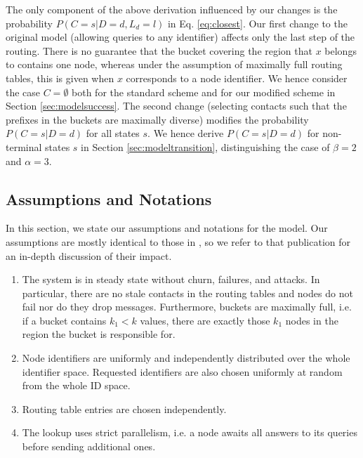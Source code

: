 \documentclass[10pt, conference, compsocconf, letterpaper]{IEEEtran}
\newcommand{\found}{\emptyset}
\begin{document}
The only component of the above derivation influenced by our changes is the probability $P(C = s | D = d,L_d=l)$ in Eq. \ref{eq:closest}. Our first change to the original model \cite{roos13comprehending} (allowing queries to any identifier) affects only the last step of the routing. There is no guarantee that the bucket covering the region that $x$ belongs to contains one node, whereas under the assumption of maximally full routing tables, this is given when $x$ corresponds to a node identifier. We hence consider the case $C=\found$ both for the standard scheme and for our modified scheme in Section \ref{sec:modelsuccess}.
The second change (selecting contacts such that the prefixes in the buckets are maximally diverse) modifies the probability $P(C = s | D = d)$ for all states $s$. We hence derive $P(C = s | D = d)$ for non-terminal states $s$ in Section \ref{sec:modeltransition}, distinguishing the case of $\beta=2$ and $\alpha=3$.

\subsection{Assumptions and Notations}
In this section, we state our assumptions and notations for the model. Our assumptions are mostly identical to those in \cite{roos13comprehending}, so we refer to that
publication for an in-depth discussion of their impact.
\begin{enumerate}
\item The system is in steady state without churn, failures, and attacks. In particular, there are no stale contacts in the routing tables and nodes do not fail nor do they drop messages. Furthermore, buckets are maximally full, i.e. if a bucket contains $k_1 < k$ values, there are exactly those $k_1$ nodes in the region the bucket is responsible for.
\item Node identifiers are uniformly and independently distributed over the whole identifier space. 
Requested identifiers are also chosen uniformly at random from the whole ID space. 
\item Routing table entries are chosen independently. 
\item The lookup uses strict parallelism, i.e. a node awaits all answers to its queries before 
sending additional ones.
\end{enumerate} 
\end{document}
